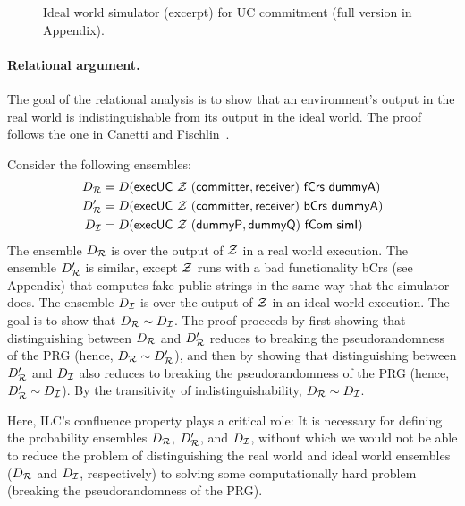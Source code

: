 \begin{figure}

\caption{Ideal world simulator (excerpt) for UC commitment (full version in Appendix).}
\label{fig:sim-short}
\end{figure}


\paragraph{Relational argument.}
The goal of the relational analysis is to show that an environment's output in
the real world is indistinguishable from its output in the ideal world. The
proof follows the one in Canetti and Fischlin~\cite{canetti2001commitments}.

\begin{sketch}
  Consider the following ensembles:
  \begin{align*}
    D_{\mathcal{{R}}} &= D(\mathsf{execUC~\mathcal{{Z}}~(committer, receiver)~fCrs~dummyA})\\
    D_{\mathcal{{R}}}' &= D(\mathsf{execUC~\mathcal{{Z}}~(committer, receiver)~bCrs~dummyA})\\
    D_{\mathcal{{I}}} &= D(\mathsf{execUC~\mathcal{{Z}}~(dummyP, dummyQ)~fCom~simI})
  \end{align*}
  \noindent The ensemble $D_{\mathcal{{R}}}$ is over the output of $\mathcal{{Z}}$ in a real
  world execution. The ensemble $D_{\mathcal{{R}}}'$ is similar, except $\mathcal{{Z}}$ runs
  with a bad functionality \textsf{bCrs} (see Appendix) that computes fake
  public strings in the same way that the simulator does. The ensemble
  $D_{\mathcal{{I}}}$ is over the output of $\mathcal{{Z}}$ in an ideal world execution. The
  goal is to show that $D_{\mathcal{{R}}} \sim D_{\mathcal{{I}}}$.
%  
  The proof proceeds by first showing that distinguishing between $D_{\mathcal{{R}}}$
  and $D_{\mathcal{{R}}}'$ reduces to breaking the pseudorandomness of the PRG (hence, $D_{\mathcal{{R}}} \sim D_{\mathcal{{R}}}'$), and then by
  showing that distinguishing between $D_{\mathcal{{R}}}'$ and $D_{\mathcal{{I}}}$ also
  reduces to breaking the pseudorandomness of the PRG (hence, $D_{\mathcal{{R}}}'
  \sim D_{\mathcal{{I}}}$). By the transitivity of indistinguishability, ${D_{\mathcal{{R}}} \sim
    D_{\mathcal{{I}}}}$.
\end{sketch}

Here, ILC's confluence property plays a critical role: It is necessary for
defining the probability ensembles $D_{\mathcal{{R}}}$, $D_{\mathcal{{R}}}'$, and
$D_{\mathcal{{I}}}$, without which we would not be able to reduce the problem of
distinguishing the real world and ideal world ensembles ($D_{\mathcal{{R}}}$ and
$D_{\mathcal{{I}}}$, respectively) to solving some computationally hard problem
(breaking the pseudorandomness of the PRG).

